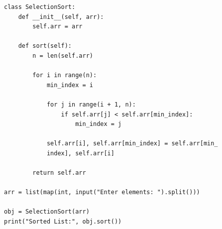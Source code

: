 \begin{verbatim}
class SelectionSort:
    def __init__(self, arr):
        self.arr = arr

    def sort(self):
        n = len(self.arr)

        for i in range(n):
            min_index = i

            for j in range(i + 1, n):
                if self.arr[j] < self.arr[min_index]:
                    min_index = j

            self.arr[i], self.arr[min_index] = self.arr[min_
            index], self.arr[i]

        return self.arr

arr = list(map(int, input("Enter elements: ").split()))

obj = SelectionSort(arr)
print("Sorted List:", obj.sort())
\end{verbatim}